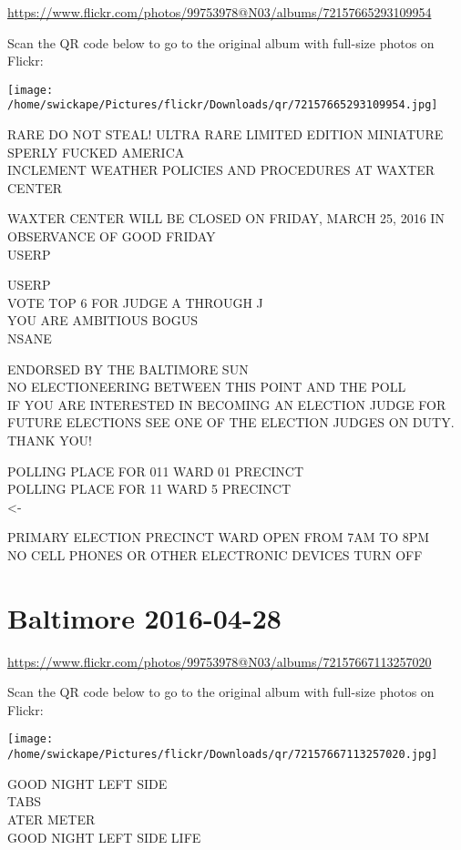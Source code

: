 \documentclass[10pt,letterpaper]{article}
\begin{document}
\url{https://www.flickr.com/photos/99753978@N03/albums/72157665293109954}

Scan the QR code below to go to the original album with full-size photos on Flickr:

\texttt{[image: /home/swickape/Pictures/flickr/Downloads/qr/72157665293109954.jpg]}


RARE DO NOT STEAL!  ULTRA RARE LIMITED EDITION MINIATURE\\
SPERLY FUCKED AMERICA\\
INCLEMENT WEATHER POLICIES AND PROCEDURES AT WAXTER CENTER

WAXTER CENTER WILL BE CLOSED ON FRIDAY, MARCH 25, 2016 IN OBSERVANCE OF GOOD FRIDAY\\
USERP

USERP\\
VOTE TOP 6 FOR JUDGE A THROUGH J\\
YOU ARE AMBITIOUS BOGUS\\
NSANE

ENDORSED BY THE BALTIMORE SUN\\
NO ELECTIONEERING BETWEEN THIS POINT AND THE POLL\\
IF YOU ARE INTERESTED IN BECOMING AN ELECTION JUDGE FOR FUTURE ELECTIONS SEE ONE OF THE ELECTION JUDGES ON DUTY.  THANK YOU!

POLLING PLACE FOR 011 WARD 01 PRECINCT\\
POLLING PLACE FOR 11 WARD 5 PRECINCT\\
<{-}

PRIMARY ELECTION PRECINCT WARD OPEN FROM 7AM TO 8PM\\
NO CELL PHONES OR OTHER ELECTRONIC DEVICES TURN OFF


\section*{Baltimore 2016-04-28}

\url{https://www.flickr.com/photos/99753978@N03/albums/72157667113257020}

Scan the QR code below to go to the original album with full-size photos on Flickr:

\texttt{[image: /home/swickape/Pictures/flickr/Downloads/qr/72157667113257020.jpg]}


GOOD NIGHT LEFT SIDE\\
TABS\\
ATER METER\\
GOOD NIGHT LEFT SIDE LIFE
\end{document}
